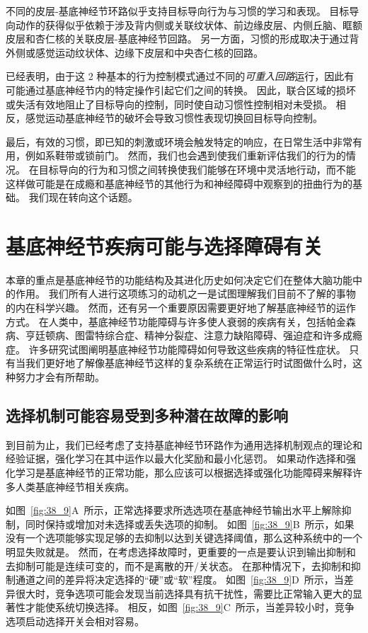 不同的皮层-基底神经节环路似乎支持目标导向行为与习惯的学习和表现。
目标导向动作的获得似乎依赖于涉及背内侧或关联纹状体、前边缘皮层、内侧丘脑、眶额皮层和杏仁核的关联皮层-基底神经节回路。
另一方面，习惯的形成取决于通过背外侧或感觉运动纹状体、边缘下皮层和中央杏仁核的回路。


已经表明，由于这 2 种基本的行为控制模式通过不同的\textit{可重入回路}运行，因此有可能通过基底神经节内的特定操作引起它们之间的转换。
因此，联合区域的损坏或失活有效地阻止了目标导向的控制，同时使自动习惯性控制相对未受损。
相反，感觉运动基底神经节的破坏会导致习惯性表现切换回目标导向控制。


最后，有效的习惯，即已知的刺激或环境会触发特定的响应，在日常生活中非常有用，例如系鞋带或锁前门。
然而，我们也会遇到使我们重新评估我们的行为的情况。
在目标导向的行为和习惯之间转换使我们能够在环境中灵活地行动，而不能这样做可能是在成瘾和基底神经节的其他行为和神经障碍中观察到的扭曲行为的基础。
我们现在转向这个话题。



\section{基底神经节疾病可能与选择障碍有关}

本章的重点是基底神经节的功能结构及其进化历史如何决定它们在整体大脑功能中的作用。
我们所有人进行这项练习的动机之一是试图理解我们目前不了解的事物的内在科学兴趣。
然而，还有另一个重要原因需要更好地了解基底神经节的运作方式。
在人类中，基底神经节功能障碍与许多使人衰弱的疾病有关，包括帕金森病、亨廷顿病、图雷特综合症、精神分裂症、注意力缺陷障碍、强迫症和许多成瘾症。
许多研究试图阐明基底神经节功能障碍如何导致这些疾病的特征性症状。
只有当我们更好地了解像基底神经节这样的复杂系统在正常运行时试图做什么时，这种努力才会有所帮助。



\subsection{选择机制可能容易受到多种潜在故障的影响}

到目前为止，我们已经考虑了支持基底神经节环路作为通用选择机制观点的理论和经验证据，强化学习在其中运作以最大化奖励和最小化惩罚。
如果动作选择和强化学习是基底神经节的正常功能，那么应该可以根据选择或强化功能障碍来解释许多人类基底神经节相关疾病。


如图~\ref{fig:38_9}A~所示，正常选择要求所选选项在基底神经节输出水平上解除抑制，同时保持或增加对未选择或丢失选项的抑制。
如图~\ref{fig:38_9}B~所示，如果没有一个选项能够实现足够的去抑制以达到关键选择阈值，那么这种系统中的一个明显失败就是。
然而，在考虑选择故障时，更重要的一点是要认识到输出抑制和去抑制可能是连续可变的，而不是离散的开/关状态。
在那种情况下，去抑制和抑制通道之间的差异将决定选择的“硬”或“软”程度。
如图~\ref{fig:38_9}D~所示，当差异很大时，竞争选项可能会发现当前选择具有抗干扰性，需要比正常输入更大的显著性才能使系统切换选择。
相反，如图~\ref{fig:38_9}C~所示，当差异较小时，竞争选项启动选择开关会相对容易。


